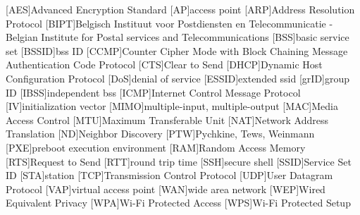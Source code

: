 
\begin{acronym}
[AES]{Advanced Encryption Standard}
[AP]{access point}
[ARP]{Address Resolution Protocol}
[BIPT]{Belgisch Instituut voor Postdiensten en Telecommunicatie - Belgian Institute for Postal services and Telecommunications}
[BSS]{basic service set}
[BSSID]{\acl{bss} ID}
[CCMP]{Counter Cipher Mode with Block Chaining Message Authentication Code Protocol}
[CTS]{Clear to Send}
[DHCP]{Dynamic Host Configuration Protocol}
[DoS]{denial of service}
[ESSID]{extended \acl{ssid}}
[grID]{group ID}
[IBSS]{independent \acl{bss}}
[ICMP]{Internet Control Message Protocol}
[IV]{initialization vector}
[MIMO]{multiple-input, multiple-output}
[MAC]{Media Access Control}
[MTU]{Maximum Transferable Unit}
[NAT]{Network Address Translation}
[ND]{Neighbor Discovery}
[PTW]{Pychkine, Tews, Weinmann}
[PXE]{preboot execution environment}
[RAM]{Random Access Memory}
[RTS]{Request to Send}
[RTT]{round trip time}
[SSH]{secure shell}
[SSID]{Service Set ID}
[STA]{station}
[TCP]{Transmission Control Protocol}
[UDP]{User Datagram Protocol}
[VAP]{virtual access point}
[WAN]{wide area network}
[WEP]{Wired Equivalent Privacy}
[WPA]{Wi-Fi Protected Access}
[WPS]{Wi-Fi Protected Setup}
\end{acronym}

